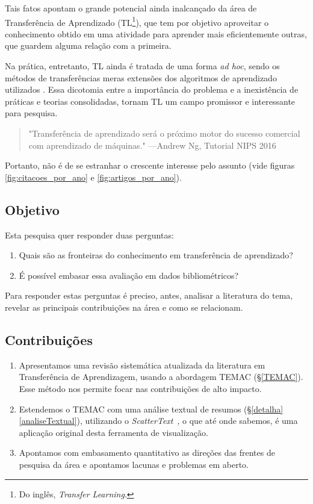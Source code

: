 \documentclass[sigconf]{acmart}
\begin{document}
  Tais fatos apontam  o grande potencial ainda inalcançado da área de Transferência de Aprendizado (TL\footnote{Do inglês, \emph{Transfer Learning}.}), que tem por objetivo aproveitar o conhecimento obtido em uma atividade para aprender mais eficientemente outras, que guardem alguma relação com a primeira.
  
  Na prática, entretanto, TL ainda é tratada de uma forma \textit{ad hoc}, sendo os métodos de transferências meras extensões dos algoritmos de aprendizado utilizados \cite{torrey}. Essa dicotomia entre a importância do problema e a inexistência de práticas e teorias consolidadas, tornam TL um campo promissor e interessante para pesquisa. 
  
  \begin{quote} "Transferência de aprendizado será o próximo motor do sucesso comercial com aprendizado de máquinas." \hfill ---Andrew Ng, Tutorial NIPS 2016 \cite{ANg}
  \end{quote}

  Portanto, não é de se estranhar o crescente interesse pelo assunto (vide figuras \ref{fig:citacoes_por_ano} e \ref{fig:artigos_por_ano}).  

  \subsection{Objetivo}\label{objetivos}
   Esta pesquisa quer responder duas perguntas:
    \begin{enumerate}
      \item{Quais são as fronteiras do conhecimento em transferência de aprendizado?}
      \item {É possível embasar essa avaliação em dados bibliométricos?}
    \end{enumerate}
    Para responder estas perguntas é preciso, antes, analisar a literatura do tema, revelar as principais contribuições na área e como se relacionam.
  
  \subsection{Contribuições}

    \begin{enumerate}[C1.]
      \item Apresentamos uma revisão sistemática atualizada da literatura em Transferência de Aprendizagem, usando a abordagem TEMAC (\S \ref{TEMAC}). Esse método nos permite focar nas contribuições de alto impacto. 
      \item Estendemos o TEMAC com uma análise textual de resumos (\S \ref{detalha}\ref{analiseTextual}), utilizando o \emph{ScatterText}~\cite{kessler2017scattertext}, o que até onde sabemos, é uma aplicação original desta ferramenta de visualização.
      \item Apontamos com embasamento quantitativo as direções das frentes de pesquisa da área e apontamos lacunas e problemas em aberto.
    \end{enumerate}
  
\end{document}
